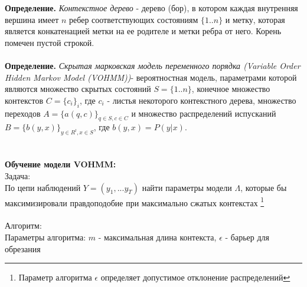 \documentclass[10pt,a4paper]{article}
\begin{document}
\textbf{Определение.} \textit{Контекстное дерево} - дерево (бор), в котором каждая внутренняя вершина имеет $ n $ ребер соответствующих состояниям $ \{1..n\} $ и метку, которая является конкатенацией метки на ее родителе и метки ребра от него. Корень помечен пустой строкой. 
\\\\
\textbf{Определение.} \textit{Скрытая марковская модель переменного порядка (Variable Order Hidden Markov Model (VOHMM))}- вероятностная модель, параметрами которой являются множество скрытых состояний $ S = \{1..n\} $, конечное множество контекстов $ C=\{c_{i}\}_{i} $, где $ c_{i} $ - листья некоторого контекстного дерева, множество переходов $ A = \{a(q, c)\}_{q \in S, c \in C}$ и множество распределений испусканий $ B = \{b(y,x)\}_{y \in R^{l}, x \in S}$, где $ b(y, x) = P(y|x)$.  
\\\\\\
\textbf{Обучение модели VOHMM:}
\\
{\large Задача:} 
\\
По цепи наблюдений $ Y = (y_{1}, ... y_{T}) $ найти параметры модели $ \Lambda$, 
которые бы максимизировали правдоподобие при максимально сжатых контекстах 
\footnote{Параметр алгоритма $ \epsilon $ определяет допустимое отклонение распределений}
\\\\
{\large Алгоритм:}
\\
Параметры алгоритма: $ m $ - максимальная длина контекста, $ \epsilon $ - барьер для обрезания
\\
\end{document}
